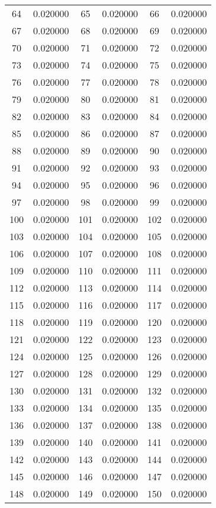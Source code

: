 \documentclass[12pt]{article}
\begin{document}
\begin{longtable}{@{}cc|cc|cc@{}}
64 & 0.020000 & 65 & 0.020000 & 66 & 0.020000 \\
67 & 0.020000 & 68 & 0.020000 & 69 & 0.020000 \\
70 & 0.020000 & 71 & 0.020000 & 72 & 0.020000 \\
73 & 0.020000 & 74 & 0.020000 & 75 & 0.020000 \\
76 & 0.020000 & 77 & 0.020000 & 78 & 0.020000 \\
79 & 0.020000 & 80 & 0.020000 & 81 & 0.020000 \\
82 & 0.020000 & 83 & 0.020000 & 84 & 0.020000 \\
85 & 0.020000 & 86 & 0.020000 & 87 & 0.020000 \\
88 & 0.020000 & 89 & 0.020000 & 90 & 0.020000 \\
91 & 0.020000 & 92 & 0.020000 & 93 & 0.020000 \\
94 & 0.020000 & 95 & 0.020000 & 96 & 0.020000 \\
97 & 0.020000 & 98 & 0.020000 & 99 & 0.020000 \\
100 & 0.020000 & 101 & 0.020000 & 102 & 0.020000 \\
103 & 0.020000 & 104 & 0.020000 & 105 & 0.020000 \\
106 & 0.020000 & 107 & 0.020000 & 108 & 0.020000 \\
109 & 0.020000 & 110 & 0.020000 & 111 & 0.020000 \\
112 & 0.020000 & 113 & 0.020000 & 114 & 0.020000 \\
115 & 0.020000 & 116 & 0.020000 & 117 & 0.020000 \\
118 & 0.020000 & 119 & 0.020000 & 120 & 0.020000 \\
121 & 0.020000 & 122 & 0.020000 & 123 & 0.020000 \\
124 & 0.020000 & 125 & 0.020000 & 126 & 0.020000 \\
127 & 0.020000 & 128 & 0.020000 & 129 & 0.020000 \\
130 & 0.020000 & 131 & 0.020000 & 132 & 0.020000 \\
133 & 0.020000 & 134 & 0.020000 & 135 & 0.020000 \\
136 & 0.020000 & 137 & 0.020000 & 138 & 0.020000 \\
139 & 0.020000 & 140 & 0.020000 & 141 & 0.020000 \\
142 & 0.020000 & 143 & 0.020000 & 144 & 0.020000 \\
145 & 0.020000 & 146 & 0.020000 & 147 & 0.020000 \\
148 & 0.020000 & 149 & 0.020000 & 150 & 0.020000 \\

\end{longtable}
\end{document}

